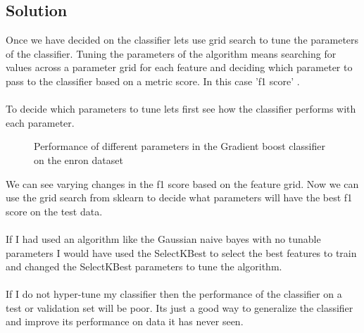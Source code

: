 \documentclass[12pt]{article}%
\begin{document}
\subsection*{Solution}
Once we have decided on the classifier lets use grid search to tune the parameters of the classifier. Tuning the parameters of the algorithm means searching for values across a parameter grid for each feature and deciding which parameter to pass to the classifier based on a metric score. In this case 'f1 score' .
\\
\\
To decide which parameters to tune lets first see how the classifier performs with each parameter.


\begin{figure}[!htbp]
\centering
  \caption{Performance of different parameters in the Gradient boost classifier on the enron dataset}
\end{figure}
We can see varying changes in the f1 score based on the feature grid. Now we can use the grid search from sklearn to decide what parameters will have the best f1 score on the test data.
\\
\\
If I had used an algorithm like the Gaussian naive bayes with no tunable parameters I would have used the SelectKBest to select the best features to train and changed the SelectKBest parameters to tune the algorithm.
\\
\\
If I do not hyper-tune my classifier then the performance of the classifier on a test or validation set will be poor. Its just a good way to generalize the classifier and improve its performance on data it has never seen.
\end{document}
